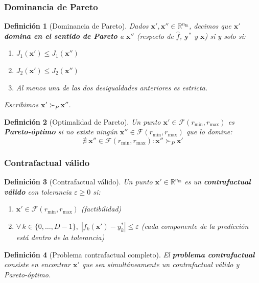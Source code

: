 \documentclass[12pt]{report} %
\newtheorem{definition}{Definición}
\begin{document}
\subsubsection{Dominancia de Pareto}

\begin{definition}[Dominancia de Pareto]
    Dados $\mathbf{x}', \mathbf{x}'' \in \mathbb{R}^{n_{\text{In}}}$, decimos que $\mathbf{x}'$ \textbf{domina en el sentido de Pareto} a $\mathbf{x}''$ (respecto de $\hat{f}$, $\mathbf{y}^*$ y $\mathbf{x}$) si y solo si:
    \begin{enumerate}
        \item $J_1(\mathbf{x}') \leq J_1(\mathbf{x}'')$
        \item $J_2(\mathbf{x}') \leq J_2(\mathbf{x}'')$
        \item Al menos una de las dos desigualdades anteriores es estricta.
    \end{enumerate}
    Escribimos $\mathbf{x}' \succ_P \mathbf{x}''$.
\end{definition}

\begin{definition}[Optimalidad de Pareto]
    Un punto $\mathbf{x}' \in \mathcal{F}(r_{\min}, r_{\max})$ es \textbf{Pareto-óptimo} si no existe ningún $\mathbf{x}'' \in \mathcal{F}(r_{\min}, r_{\max})$ que lo domine:
    $$\nexists\; \mathbf{x}'' \in \mathcal{F}(r_{\min}, r_{\max}) : \mathbf{x}'' \succ_P \mathbf{x}'$$
\end{definition}

\subsubsection{Contrafactual válido}

\begin{definition}[Contrafactual válido]
    Un punto $\mathbf{x}' \in \mathbb{R}^{n_{\text{In}}}$ es un \textbf{contrafactual válido} con tolerancia $\varepsilon \geq 0$ si:
    \begin{enumerate}
        \item $\mathbf{x}' \in \mathcal{F}(r_{\min}, r_{\max})$ \quad (factibilidad)
        \item $\forall\, k \in \{0, \ldots, D-1\},\; |f_k(\mathbf{x}') - y^*_k| \leq \varepsilon$ \quad (cada componente de la predicción está dentro de la tolerancia)
    \end{enumerate}
\end{definition}

\begin{definition}[Problema contrafactual completo]
    El \textbf{problema contrafactual} consiste en encontrar $\mathbf{x}'$ que sea simultáneamente un contrafactual válido y Pareto-óptimo.
\end{definition}
\end{document}
